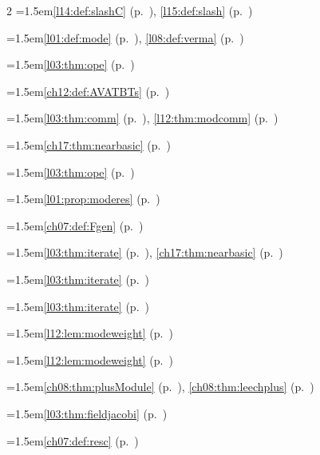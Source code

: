 \begin{multicols}{2}
\hangindent=1.5em\quad \ref{l14:def:slashC} (p.~\pageref{l14:def:slashC}), \ref{l15:def:slash} (p.~\pageref{l15:def:slash})\par
\hangindent=1.5em\quad \ref{l01:def:mode} (p.~\pageref{l01:def:mode}), \ref{l08:def:verma} (p.~\pageref{l08:def:verma})\par
\hangindent=1.5em\quad \ref{l03:thm:ope} (p.~\pageref{l03:thm:ope})\par
\hangindent=1.5em\quad \ref{ch12:def:AVATBTs} (p.~\pageref{ch12:def:AVATBTs})\par
\hangindent=1.5em\quad \ref{l03:thm:comm} (p.~\pageref{l03:thm:comm}), \ref{l12:thm:modcomm} (p.~\pageref{l12:thm:modcomm})\par
\hangindent=1.5em\quad \ref{ch17:thm:nearbasic} (p.~\pageref{ch17:thm:nearbasic})\par
\hangindent=1.5em\quad \ref{l03:thm:ope} (p.~\pageref{l03:thm:ope})\par
\hangindent=1.5em\quad \ref{l01:prop:moderes} (p.~\pageref{l01:prop:moderes})\par
\hangindent=1.5em\quad \ref{ch07:def:Fgen} (p.~\pageref{ch07:def:Fgen})\par
\hangindent=1.5em\quad \ref{l03:thm:iterate} (p.~\pageref{l03:thm:iterate}), \ref{ch17:thm:nearbasic} (p.~\pageref{ch17:thm:nearbasic})\par
\hangindent=1.5em\quad \ref{l03:thm:iterate} (p.~\pageref{l03:thm:iterate})\par
\hangindent=1.5em\quad \ref{l03:thm:iterate} (p.~\pageref{l03:thm:iterate})\par
\hangindent=1.5em\quad \ref{l12:lem:modeweight} (p.~\pageref{l12:lem:modeweight})\par
\hangindent=1.5em\quad \ref{l12:lem:modeweight} (p.~\pageref{l12:lem:modeweight})\par
\hangindent=1.5em\quad \ref{ch08:thm:plusModule} (p.~\pageref{ch08:thm:plusModule}), \ref{ch08:thm:leechplus} (p.~\pageref{ch08:thm:leechplus})\par
\hangindent=1.5em\quad \ref{l03:thm:fieldjacobi} (p.~\pageref{l03:thm:fieldjacobi})\par
\hangindent=1.5em\quad \ref{ch07:def:resc} (p.~\pageref{ch07:def:resc})\par

\end{multicols}
